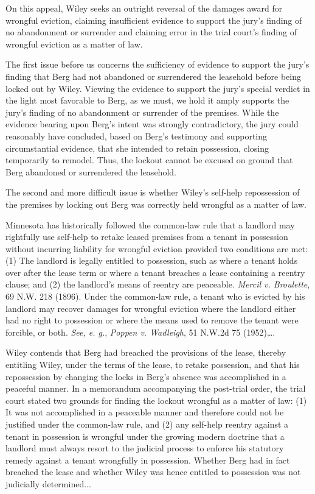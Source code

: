 On this appeal, Wiley seeks an outright reversal of the
damages award for wrongful eviction, claiming insufficient evidence to support
the jury's finding of no abandonment or surrender and claiming error in the
trial court's finding of wrongful eviction as a matter of law.

The first issue before us concerns the sufficiency of evidence to support the
jury's finding that Berg had not abandoned or
surrendered the leasehold before being locked out by
Wiley. Viewing the evidence to support the jury's
special verdict in the light most favorable to Berg, as
we must, we hold it amply supports the jury's finding of no
abandonment or surrender of the premises. While the evidence bearing upon
Berg's intent was strongly contradictory, the jury
could reasonably have concluded, based on Berg's
testimony and supporting circumstantial evidence, that she intended to retain
possession, closing temporarily to remodel. Thus, the lockout cannot be excused
on ground that Berg abandoned or surrendered the
leasehold.

The second and more difficult issue is whether Wiley's
self-help repossession of the premises by locking out
Berg was correctly held wrongful as a matter of law.

Minnesota has historically followed the common-law rule that a landlord may
rightfully use self-help to retake leased premises from a tenant in possession
without incurring liability for wrongful eviction provided two conditions are
met: (1) The landlord is legally entitled to possession, such as where a tenant
holds over after the lease term or where a tenant breaches a lease containing a
reentry clause; and (2) the landlord's means of reentry are peaceable.
\textit{Mercil v. Broulette}, 69 N.W. 218 (1896). Under the common-law rule, a
tenant who is evicted by his landlord may recover damages for wrongful eviction
where the landlord either had no right to possession or where the means used to
remove the tenant were forcible, or both. \textit{See, e. g.}, \textit{Poppen
v. Wadleigh}, 51 N.W.2d 75 (1952)\ldots. 

Wiley contends that Berg had
breached the provisions of the lease, thereby entitling
Wiley, under the terms of the lease, to retake
possession, and that his repossession by changing the locks in
Berg's absence was accomplished in a peaceful manner.
In a memorandum accompanying the post-trial order, the trial court stated two
grounds for finding the lockout wrongful as a matter of law: (1) It was not
accomplished in a peaceable manner and therefore could not be justified under
the common-law rule, and (2) any self-help reentry against a tenant in
possession is wrongful under the growing modern doctrine that a landlord must
always resort to the judicial process to enforce his statutory remedy against a
tenant wrongfully in possession. Whether Berg had in
fact breached the lease and whether Wiley was hence
entitled to possession was not judicially determined.\ldots 

